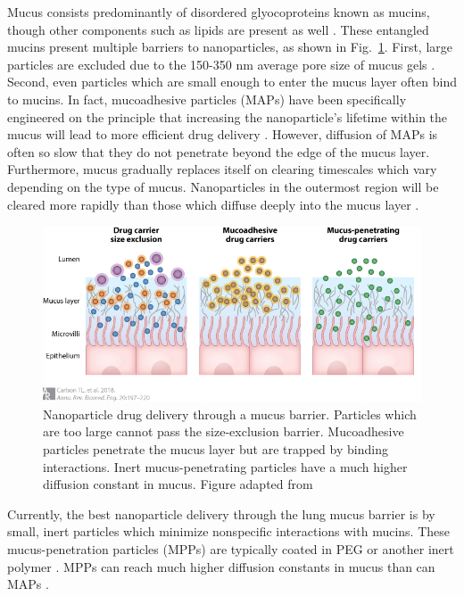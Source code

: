 Mucus consists predominantly of disordered glyocoproteins known as mucins, though other components such as lipids are present as well \cite{witten17}.  These entangled mucins present multiple barriers to nanoparticles, as shown in Fig.~\ref{fig:mucus}.  First, large particles are excluded due to the 150-350 nm average pore size of mucus gels \cite{lai10,lai11}.  Second, even particles which are small enough to enter the mucus layer often bind to mucins.  In fact, mucoadhesive particles (MAPs) have been specifically engineered on the principle that increasing the nanoparticle's lifetime within the mucus will lead to more efficient drug delivery \cite{peppas85}.  However, diffusion of MAPs is often so slow that they do not penetrate beyond the edge of the mucus layer.  Furthermore, mucus gradually replaces itself on clearing timescales which vary depending on the type of mucus.  Nanoparticles in the outermost region will be cleared more rapidly than those which diffuse deeply into the mucus layer \cite{lay03}.

\begin{figure}
\centering
\includegraphics[width=0.8\linewidth]{figs/ch01/carlson-mucus.pdf}
\caption[Nanoparticle drug delivery through a mucus barrier.]{ Nanoparticle drug delivery through a mucus barrier.  Particles which are too large cannot pass the size-exclusion barrier.  Mucoadhesive particles penetrate the mucus layer but are trapped by binding interactions.  Inert mucus-penetrating particles have a much higher diffusion constant in mucus.  Figure adapted from \cite{carlson18,popov16}}
\label{fig:mucus}
\end{figure}

Currently, the best nanoparticle delivery through the lung mucus barrier is by small, inert particles which minimize nonspecific interactions with mucins.  These mucus-penetration particles (MPPs) are typically coated in PEG or another inert polymer \cite{schneider17, huang17}.  MPPs can reach much higher diffusion constants in mucus than can MAPs \cite{mastorakos15,lai11,porsio18,tang09}.

